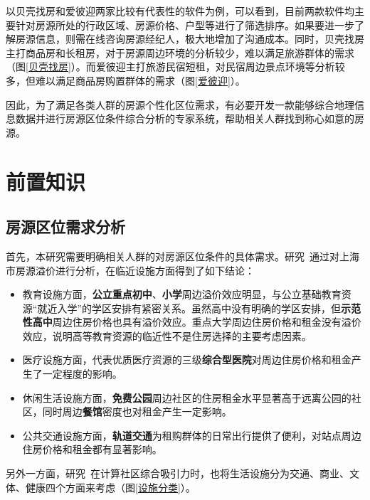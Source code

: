 \documentclass{article}
\begin{document}
以贝壳找房和爱彼迎两家比较有代表性的软件为例，可以看到，目前两款软件均主要针对房源所处的行政区域、房源价格、户型等进行了筛选排序。如果要进一步了解房源信息，则需在线咨询房源经纪人，极大地增加了沟通成本。同时，贝壳找房主打商品房和长租房，对于房源周边环境的分析较少，难以满足旅游群体的需求（图\ref{贝壳找房}）。而爱彼迎主打旅游民宿短租，对民宿周边景点环境等分析较多，但难以满足商品房购置群体的需求（图\ref{爱彼迎}）。

因此，为了满足各类人群的房源个性化区位需求，有必要开发一款能够综合地理信息数据并进行房源区位条件综合分析的专家系统，帮助相关人群找到称心如意的房源。

\section{前置知识}
\subsection{房源区位需求分析}

首先，本研究需要明确相关人群的对房源区位条件的具体需求。研究~\cite{需求分析}通过对上海市房源溢价进行分析，在临近设施方面得到了如下结论：

\begin{itemize}
    \item 教育设施方面，\textbf{公立重点初中}、\textbf{小学}周边溢价效应明显，与公立基础教育资源“就近入学”的学区安排有紧密关系。虽然高中没有明确的学区安排，但\textbf{示范性高中}周边住房价格也具有溢价效应。重点大学周边住房价格和租金没有溢价效应，说明高等教育资源的临近性不是住房选择的主要考虑因素。
    
    \item 医疗设施方面，代表优质医疗资源的三级\textbf{综合型医院}对周边住房价格和租金产生了一定程度的影响。
    
    \item 休闲生活设施方面，\textbf{免费公园}周边社区的住房租金水平显著高于远离公园的社区，同时周边\textbf{餐馆}密度也对租金产生一定影响。
    
    \item 公共交通设施方面，\textbf{轨道交通}为租购群体的日常出行提供了便利，对站点周边住房价格和租金都有显著影响。
\end{itemize}

另外一方面，研究~\cite{poi分类}在计算社区综合吸引力时，也将生活设施分为交通、商业、文体、健康四个方面来考虑（图\ref{设施分类}）。
\end{document}
